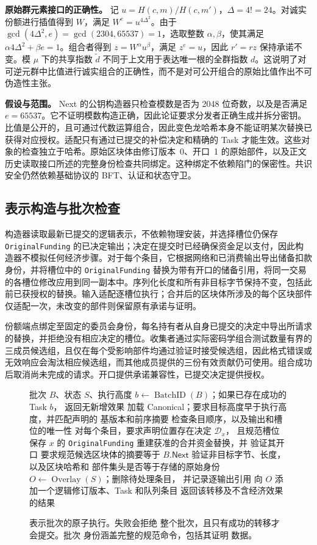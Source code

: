 \noindent\textbf{原始群元素接口的正确性。} 记 $u=H(c,m)/H(c,m')$，$\Delta=4!=24$。对诚实份额进行插值得到 $W$，满足 $W^e=u^{4\Delta^2}$。由于 $\gcd(4\Delta^2,e)=\gcd(2304,65537)=1$，选取整数 $\alpha,\beta$，使其满足 $\alpha4\Delta^2+\beta e=1$。组合者得到 $z=W^\alpha u^\beta$，满足 $z^e=u$，因此 $r'=rz$ 保持承诺不变。模 $\mu$ 下的共享指数 $\widetilde d$ 不同于上文用于表达唯一根的全群指数 $d$。这说明了对可逆元群中比值进行诚实组合的正确性，而不是对可公开组合的原始比值作出不可伪造性主张。

\noindent\textbf{假设与范围。} Next 的公钥构造器只检查模数是否为 2048 位奇数，以及是否满足 $e=65537$。它不证明模数构造正确，因此论证要求分发者正确生成并拆分密钥。比值是公开的，且可通过代数运算组合，因此变色龙哈希本身不能证明某次替换已获得对应授权。适配只有通过已提交的补偿决定和精确的 Task 才能生效。这些对象的检查独立于哈希。原始区块体由修订版本~0、开口~1 的原始部件，以及正文历史读取接口所述的完整身份检查共同绑定。这种绑定不依赖陷门的保密性。共识安全仍然依赖基础协议的 BFT、认证和状态守卫。

\subsection{表示构造与批次检查}
构造器读取最新已提交的逻辑表示，不依赖物理安装，并选择槽位仍保存 \texttt{OriginalFunding} 的已决定输出；决定在提交时已经确保资金足以支付，因此构造器不模拟任何经济步骤。对于每个条目，它根据网络和已消费输出导出储备扣款身份，并将槽位中的 \texttt{OriginalFunding} 替换为带有开口的储备引用，将同一交易的各槽位修改应用到同一副本中。序列化长度和所有非目标字节保持不变，包括此前已获授权的替换。输入适配逐槽位执行；合并后的区块体所涉及的每个区块部件仅适配一次，未改变的部件则保留原有承诺与证明。

份额端点绑定至固定的委员会身份，每名持有者从自身已提交的决定中导出所请求的替换，并拒绝没有相应决定的槽位。收集者通过实际密码学组合测试数量有界的三成员候选组，且仅在每个受影响部件均通过验证时接受候选组，因此格式错误或无效响应会淘汰相应候选组，而其他成员提供的三份有效贡献仍可使用。组合成功后取消尚未完成的请求。开口提供承诺兼容性，已提交决定提供授权。

\begin{figure}[t]
  \small
  \begin{algorithmic}[1]
    \REQUIRE 批次 $B$、状态 $S$、执行高度
    \STATE $b\gets\operatorname{BatchID}(B)$；如果已存在成功的 Task $b$，
    返回无新增效果
    \STATE 加载 Canonical；要求目标高度早于执行高度，并匹配声明的
    基版本和前序摘要
    \STATE 检查条目顺序，以及输出和槽位的唯一性
    \STATE 对每个条目，要求声明位置存在决定 $\mathcal D_x$，
    且规范槽位保存 $x$ 的 \texttt{OriginalFunding}
    \STATE 重建获准的合并资金替换，并
    验证其开口
    \STATE 要求规范候选区块体的摘要等于
    $B.\mathsf{Next}$
    \STATE 验证非目标字节、长度，以及区块哈希和
    部件集头是否等于存储的原始身份
    \STATE $O\gets\operatorname{Overlay}(S)$；删除待处理条目，
    并记录逐输出引用
    \STATE 向 $O$ 添加一个逻辑修订版本、Task 和队列条目
    \STATE 返回该转移及不含经济效果的结果
  \end{algorithmic}
  \caption{表示批次的原子执行。失败会拒绝
    整个批次，且只有成功的转移才会提交。批次
    身份涵盖完整的规范命令，包括其证明
    数据。}
  \label{fig:supp-protocol-batch}
\end{figure}


